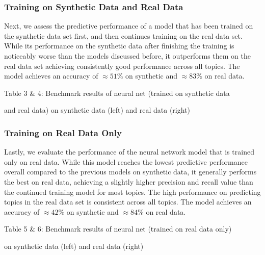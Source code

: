 \documentclass[11pt]{article}
\begin{document}
\subsubsection{Training on Synthetic Data and Real Data}
Next, we assess the predictive performance of a model that has been trained on the synthetic data set first, and then continues training on the real data set. While its performance on the synthetic data after finishing the training is noticeably worse than the models discussed before, it outperforms them on the real data set achieving consistently good performance across all topics.
The model achieves an accuracy of $\approx 51\%$ on synthetic and $\approx 83\%$ on real data.

\begin{center}

\qquad

\end{center}
\begin{center}
Table 3 \& 4: Benchmark results of neural net (trained on synthetic data 

and real data) on synthetic data (left) and real data (right)
\end{center}

\subsubsection{Training on Real Data Only}
Lastly, we evaluate the performance of the neural network model that is trained only on real data. While this model reaches the lowest predictive performance overall compared to the previous models on synthetic data, it generally performs the best on real data, achieving a slightly higher precision and recall value than the continued training model for most topics. The high performance on predicting topics in the real data set is consistent across all topics.
The model achieves an accuracy of $\approx 42\%$ on synthetic and $\approx 84\%$ on real data.

\begin{center}

\qquad

\end{center}
\begin{center}
Table 5 \& 6: Benchmark results of neural net (trained on real data only)

 on synthetic data (left) and real data (right)
\end{center}
\end{document}
